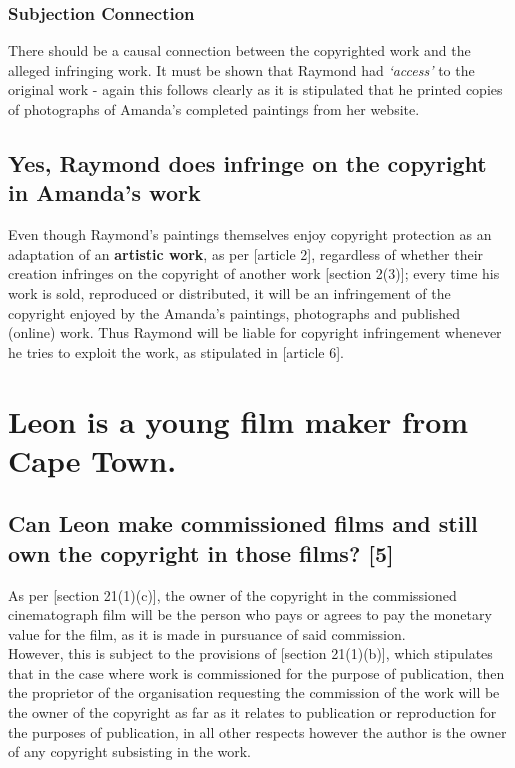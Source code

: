 \documentclass[11pt]{article}
\begin{document}
\subsubsection{Subjection Connection}
\label{sec:org9e19583}
There should be a causal connection between the copyrighted work and the alleged
infringing work. It must be shown that Raymond had \emph{`access'} to the original
work - again this follows clearly as it is stipulated that he printed copies of
photographs of Amanda's completed paintings from her website.

\subsection{Yes, Raymond does infringe on the copyright in Amanda's work}
\label{sec:org77b19f1}
Even though Raymond's paintings themselves enjoy copyright protection as
an adaptation of an \textbf{artistic work}, as per [article
2]\cite{wipo86_berne}, regardless of whether their creation infringes on the
copyright of another work [section 2(3)]\cite{rsa78_copyrightact}; every time his work is sold, reproduced or distributed,
it will be an infringement of the copyright enjoyed by the Amanda's paintings,
photographs and published (online) work. Thus Raymond will be liable for
copyright infringement whenever he tries to exploit the work, as stipulated in [article 6]\cite{wto17_trips}.


\section{Leon is a young film maker from Cape Town.}
\label{sec:org13f58bb}

\subsection{Can Leon make commissioned films and still own the copyright in those films? [5]}
\label{sec:orgd493d1d}
As per [section 21(1)(c)]\cite{rsa78_copyrightact}, the owner of the copyright in
the commissioned cinematograph film will be the person who pays or agrees to pay
the monetary value for the film, as it is made in pursuance of said
commission.\\

However, this is subject to the provisions of [section 21(1)(b)]\cite{rsa78_copyrightact}, which stipulates that in the case where work
is commissioned for the purpose of publication, then the proprietor of the
organisation requesting the commission of the work will be the owner of the
copyright as far as it relates to publication or reproduction for the purposes
of publication, in all other respects however the author is the owner of any
copyright subsisting in the work.\\
\end{document}
